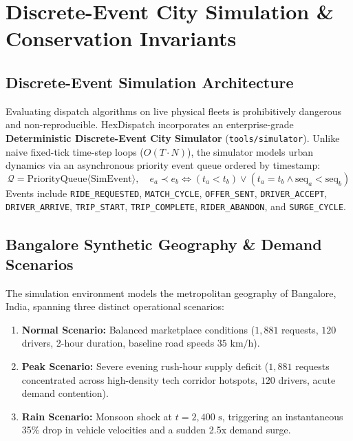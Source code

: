 \documentclass[11pt,a4paper]{article}
\begin{document}
\section{Discrete-Event City Simulation \& Conservation Invariants}

\subsection{Discrete-Event Simulation Architecture}
Evaluating dispatch algorithms on live physical fleets is prohibitively dangerous and non-reproducible. HexDispatch incorporates an enterprise-grade \textbf{Deterministic Discrete-Event City Simulator} (\texttt{tools/simulator}).
Unlike naive fixed-tick time-step loops ($O(T \cdot N)$), the simulator models urban dynamics via an asynchronous priority event queue ordered by timestamp:
\begin{equation}
    \mathcal{Q} = \text{PriorityQueue}\langle \text{SimEvent} \rangle, \quad e_a \prec e_b \iff (t_a < t_b) \lor (t_a = t_b \land \text{seq}_a < \text{seq}_b)
\end{equation}
Events include \texttt{RIDE\_REQUESTED}, \texttt{MATCH\_CYCLE}, \texttt{OFFER\_SENT}, \texttt{DRIVER\_ACCEPT}, \texttt{DRIVER\_ARRIVE}, \texttt{TRIP\_START}, \texttt{TRIP\_COMPLETE}, \texttt{RIDER\_ABANDON}, and \texttt{SURGE\_CYCLE}.

\subsection{Bangalore Synthetic Geography \& Demand Scenarios}
The simulation environment models the metropolitan geography of Bangalore, India, spanning three distinct operational scenarios:
\begin{enumerate}[leftmargin=1.5em]
    \item \textbf{Normal Scenario:} Balanced marketplace conditions ($1,881$ requests, $120$ drivers, 2-hour duration, baseline road speeds $35\text{ km/h}$).
    \item \textbf{Peak Scenario:} Severe evening rush-hour supply deficit ($1,881$ requests concentrated across high-density tech corridor hotspots, $120$ drivers, acute demand contention).
    \item \textbf{Rain Scenario:} Monsoon shock at $t = 2,400\text{ s}$, triggering an instantaneous 35\% drop in vehicle velocities and a sudden 2.5x demand surge.
\end{enumerate}
\end{document}
